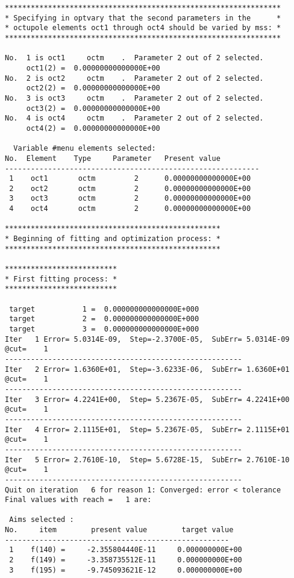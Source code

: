 \begin{footnotesize}
\begin{verbatim}
****************************************************************
* Specifying in optvary that the second parameters in the      *
* octupole elements oct1 through oct4 should be varied by mss: *
****************************************************************

No.  1 is oct1     octm    .  Parameter 2 out of 2 selected.
     oct1(2) =  0.00000000000000E+00
No.  2 is oct2     octm    .  Parameter 2 out of 2 selected.
     oct2(2) =  0.00000000000000E+00
No.  3 is oct3     octm    .  Parameter 2 out of 2 selected.
     oct3(2) =  0.00000000000000E+00
No.  4 is oct4     octm    .  Parameter 2 out of 2 selected.
     oct4(2) =  0.00000000000000E+00

  Variable #menu elements selected:
No.  Element    Type     Parameter   Present value
-----------------------------------------------------------
 1    oct1       octm         2      0.00000000000000E+00
 2    oct2       octm         2      0.00000000000000E+00
 3    oct3       octm         2      0.00000000000000E+00
 4    oct4       octm         2      0.00000000000000E+00

**************************************************
* Beginning of fitting and optimization process: *
**************************************************

**************************
* First fitting process: *
**************************

 target           1 =  0.000000000000000E+000
 target           2 =  0.000000000000000E+000
 target           3 =  0.000000000000000E+000
Iter   1 Error= 5.0314E-09,  Step=-2.3700E-05,  SubErr= 5.0314E-09 @cut=    1
-------------------------------------------------------
Iter   2 Error= 1.6360E+01,  Step=-3.6233E-06,  SubErr= 1.6360E+01 @cut=    1
-------------------------------------------------------
Iter   3 Error= 4.2241E+00,  Step= 5.2367E-05,  SubErr= 4.2241E+00 @cut=    1
-------------------------------------------------------
Iter   4 Error= 2.1115E+01,  Step= 5.2367E-05,  SubErr= 2.1115E+01 @cut=    1
-------------------------------------------------------
Iter   5 Error= 2.7610E-10,  Step= 5.6728E-15,  SubErr= 2.7610E-10 @cut=    1
-------------------------------------------------------
Quit on iteration   6 for reason 1: Converged: error < tolerance
Final values with reach =   1 are:

 Aims selected :
No.     item        present value        target value
----------------------------------------------------
 1    f(140) =     -2.355804440E-11     0.000000000E+00
 2    f(149) =     -3.358735512E-11     0.000000000E+00
 3    f(195) =     -9.745093621E-12     0.000000000E+00


\end{verbatim}
\end{footnotesize}
